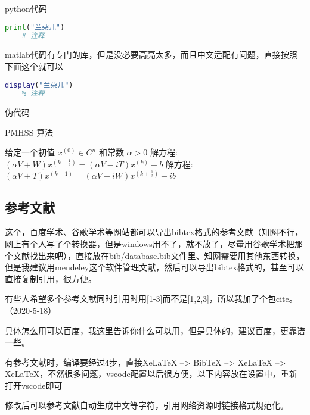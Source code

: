 \documentclass[AutoFakeBold]{LZUThesis}
\begin{document}
python代码
\begin{lstlisting}[language = python]
    print("兰朵儿")
    # 注释
\end{lstlisting}

matlab代码有专门的库，但是没必要高亮太多，而且中文适配有问题，直接按照下面这个就可以
\begin{lstlisting}[language = matlab]
    display("兰朵儿")
    % 注释
\end{lstlisting}


伪代码

\begin{algorithm}[H]
    \caption{PMHSS 算法\label{Alg:PMHSS}}
    \begin{algorithmic}[1]
      \State 给定一个初值 $ x^{(0)} \in C^{n} $  和常数 $\alpha>0$
      \State 解方程: $(\alpha V+W)x^{(k+\frac{1}{2})}=(\alpha V-i T)x^{(k)}+b $
      \State 解方程: $(\alpha V+T)x^{(k+1)}=(\alpha V+i W)x^{(k+\frac{1}{2})}-i b$
      \EndFor
    \end{algorithmic}
\end{algorithm}

\subsection{参考文献} %
\label{sub:参考文献}

这个，百度学术、谷歌学术等网站都可以导出bibtex格式的参考文献（知网不行，网上有个人写了个转换器，但是windows用不了，就不放了，尽量用谷歌学术把那个文献找出来吧），直接放在bib/database.bib文件里、知网需要用其他东西转换，但是我建议用mendeley这个软件管理文献，然后可以导出bibtex格式的，甚至可以直接复制引用，很方便\cite{partl2016, tenne1992polyhedral, tussyadiah2015hotels}。

有些人希望多个参考文献同时引用时用[1-3]而不是[1,2,3]，所以我加了个包cite。（2020-5-18）

具体怎么用可以百度，我这里告诉你什么可以用，但是具体的，建议百度，更靠谱一些。


有参考文献时，编译要经过4步，直接XeLaTeX --> BibTeX --> XeLaTeX --> XeLaTeX，不然很多问题，vscode配置以后很方便，以下内容放在设置中，重新打开vscode即可

修改后可以参考文献自动生成中文等字符\cite{partl2021}\cite{partl2022}\cite{partl2022-2}，引用网络资源时链接格式规范化\cite{intelnewsroomIntelUnveils12th2021,wilsonHistoryDevelopmentParallel1994}。
\end{document}
